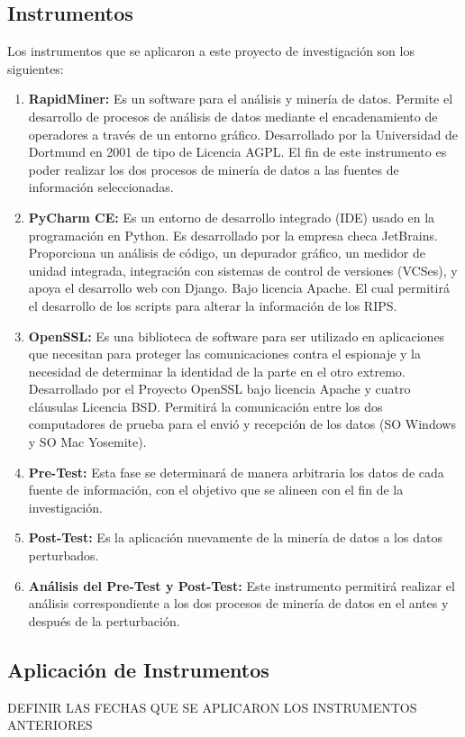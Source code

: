 \documentclass[a4paper,openright,12pt]{book}
\theoremstyle{definition}
\theoremstyle{remark}
\begin{document}
    \subsection{Instrumentos}
    Los instrumentos que se aplicaron a este proyecto de investigación son los siguientes:
    \begin{enumerate}
		\item \textbf{RapidMiner:} Es un software para el análisis y minería de datos. Permite el desarrollo de procesos de análisis de datos mediante el encadenamiento de operadores a través de un entorno gráfico. Desarrollado por la Universidad de Dortmund en 2001 de tipo de Licencia AGPL. El fin de este instrumento es poder realizar los dos procesos de minería de datos a las fuentes de información seleccionadas.
        \item \textbf{PyCharm CE:} Es un entorno de desarrollo integrado (IDE) usado en la programación en Python. Es desarrollado por la empresa checa JetBrains. Proporciona un análisis de código, un depurador gráfico, un medidor de unidad integrada, integración con sistemas de control de versiones (VCSes), y apoya el desarrollo web con Django. Bajo licencia Apache. El cual permitirá el desarrollo de los scripts para alterar la información de los RIPS.
        \item \textbf{OpenSSL:} Es una biblioteca de software para ser utilizado en aplicaciones que necesitan para proteger las comunicaciones contra el espionaje y la necesidad de determinar la identidad de la parte en el otro extremo. Desarrollado por el Proyecto OpenSSL bajo licencia Apache y cuatro cláusulas Licencia BSD. Permitirá la comunicación entre los dos computadores de prueba para el envió y recepción de los datos (SO Windows y SO Mac Yosemite).
        \item \textbf{Pre-Test:} Esta fase se determinará de manera arbitraria los datos de cada fuente de información, con el objetivo que se alineen con el  fin de la investigación.
        \item \textbf{Post-Test:} Es la aplicación nuevamente de la minería de datos a los datos perturbados.
        \item \textbf{Análisis del Pre-Test y Post-Test:} Este instrumento permitirá realizar el análisis correspondiente a los dos procesos de minería de datos en el antes y después de la perturbación.
\end{enumerate}
    \subsection{Aplicación de Instrumentos}
    DEFINIR LAS FECHAS QUE SE APLICARON LOS INSTRUMENTOS ANTERIORES
\end{document}
